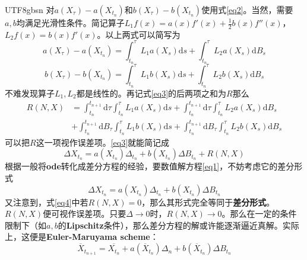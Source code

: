 \documentclass{article}
\begin{document}
\begin{CJK*}{UTF8}{gbsn}
对$a(X_\tau)-a(X_{t_{n}})$和$b(X_\tau)-b(X_{t_{n}})$使用式\ref{eq2}。当然，需要$a,b$均满足光滑性条件。简记算子$L_1f(x)=a(x)f'(x)+\frac{1}{2}b(x)f''(x)$，$L_2f(x)=b(x)f'(x)$。以上两式可以简写为
\begin{equation}\label{eq6}
a(X_\tau)-a(X_{t_{n}})=\int_{t_n}^\tau L_1a(X_s)\mathrm{d}s+\int_{t_n}^\tau L_2a(X_s)\mathrm{d}B_s
\end{equation}
\begin{equation}\label{eq7}
b(X_\tau)-b(X_{t_{n}})=\int_{t_n}^\tau L_1b(X_s)\mathrm{d}s+\int_{t_n}^\tau L_2b(X_s)\mathrm{d}B_s
\end{equation}
不难发现算子$L_1,L_2$都是线性的。再记式\ref{eq3}的后两项之和为$R$那么
\begin{equation}\begin{aligned}
R(N,X)
&=\int_{t_n}^{t_{n+1}}\mathrm{d}\tau\int_{t_n}^\tau L_1a(X_s)\mathrm{d}s+
\int_{t_n}^{t_{n+1}}\mathrm{d}\tau\int_{t_n}^\tau L_2a(X_s)\mathrm{d}B_s\\
&+\int_{t_n}^{t_{n+1}}\mathrm{d}B_\tau\int_{t_n}^\tau L_1b(X_s)\mathrm{d}s
+\int_{t_n}^{t_{n+1}}\mathrm{d}B_\tau\int_{t_n}^\tau L_2b(X_s)\mathrm{d}B_s
\end{aligned}\label{eq8}\end{equation}
可以把$R$这一项视作误差项。\ref{eq3}就能简记成
\begin{equation}
    \Delta X_{t_n}=a(X_{t_n})\Delta_{t_n}+b(X_{t_{n}})\Delta B_{t_n}+R(N,X)\label{eq4}
\end{equation}
根据一般将\textbf{ode}转化成差分方程的经验，要数值解方程\ref{eq1}，不妨考虑它的差分形式
\begin{equation}
    \Delta X_{t_n}=a(X_{t_n})\Delta_{t_n}+b(X_{t_{n}})\Delta B_{t_n}
\end{equation}
又注意到，式\ref{eq4}中若$R(N,X)=0$，那么其形式完全等同于\textbf{差分形式}。$R(N,X)$便可视作误差项。只要$\Delta\to0$时，$R(N,X)\to0$。那么在一定的条件限制下（如$a,b$的\textbf{Lipschitz}条件），那么差分方程的解或许能逐渐逼近真解。实际上，这便是\textbf{Euler-Maruyama scheme}：
\begin{equation}
    \overline{X}_{t_{n+1}}=\overline{X_{t_n}}+a(\overline{X}_{t_{n}})\Delta_n+b(\overline{X}_{t_{n}})\Delta B_{t_n}
\end{equation}


\end{CJK*}
\end{document}
